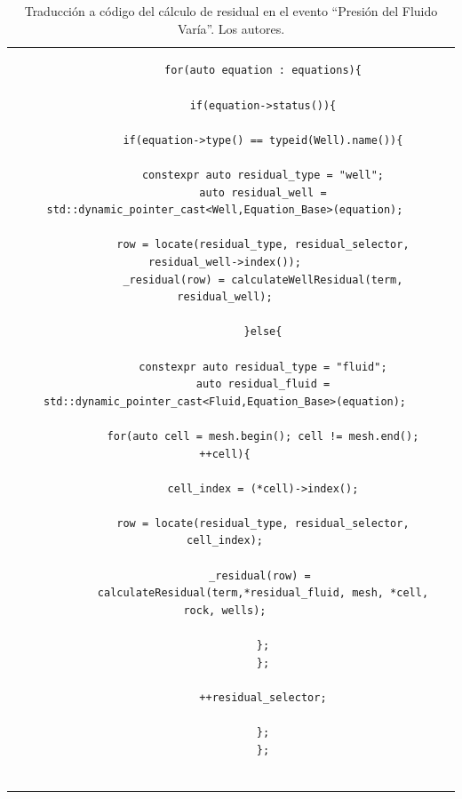 \begin{appendix}
\begin{table}[h]
\begin{tabular}{cc}
\begin{tiny}
\begin{lstlisting}
			for(auto equation : equations){
			
			if(equation->status()){
			
			if(equation->type() == typeid(Well).name()){
			
			constexpr auto residual_type = "well";
			auto residual_well = std::dynamic_pointer_cast<Well,Equation_Base>(equation);
			
			row = locate(residual_type, residual_selector, residual_well->index());
			_residual(row) = calculateWellResidual(term, residual_well);
			
			}else{
			
			constexpr auto residual_type = "fluid";
			auto residual_fluid = std::dynamic_pointer_cast<Fluid,Equation_Base>(equation);
			
			for(auto cell = mesh.begin(); cell != mesh.end(); ++cell){
			
			cell_index = (*cell)->index();
			
			row = locate(residual_type, residual_selector, cell_index);
			
			_residual(row) = 
			calculateResidual(term,*residual_fluid, mesh, *cell, rock, wells);
			
			};
			};
			
			++residual_selector;
			
			};
			};
			
			\end{lstlisting}
		\end{tiny}
	\end{tabular}
	\label{tab:ResidualCode}
	\caption[Traducción a código del cálculo de residual en el evento ``Presión del Fluido Varía''.]{Traducción a código del cálculo de residual en el evento ``Presión del Fluido Varía''. Los autores.}
\end{table}


\end{appendix}
